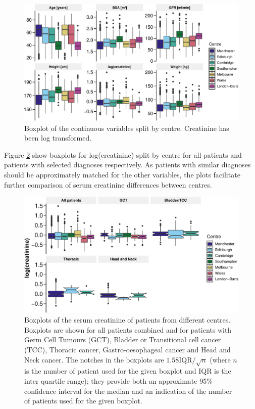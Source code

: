 \documentclass[11pt,]{article}
\begin{document}
\begin{figure}
\centering
\includegraphics{1_Validation_nonIDMS_files/figure-latex/data_characteristics_plot_1-1.pdf}
\caption{\label{fig:centre_boxplot}Boxplot of the continuous variables
split by centre. Creatinine has been log transformed.}
\end{figure}

Figure \ref{fig:boxplot_creat} show boxplots for log(creatinine) split
by centre for all patients and patients with selected diagnoses
respectively. As patients with similar diagnoses should be approximately
matched for the other variables, the plots facilitate further comparison
of serum creatinine differences between centres.

\begin{figure}
\centering
\includegraphics{1_Validation_nonIDMS_files/figure-latex/PLOT_analyse_creatinine-1.pdf}
\caption{\label{fig:boxplot_creat}Boxplots of the serum creatinine of
patients from different centres. Boxplots are shown for all patients
combined and for patients with Germ Cell Tumours (GCT), Bladder or
Transitional cell cancer (TCC), Thoracic cancer, Gastro-oesophageal
cancer and Head and Neck cancer. The notches in the boxplots are
\(1.58 \text{IQR} / \sqrt{n}\) (where \(n\) is the number of patient
used for the given boxplot and IQR is the inter quartile range); they
provide both an approximate 95\% confidence interval for the median and
an indication of the number of patients used for the given boxplot.}
\end{figure}
\end{document}
